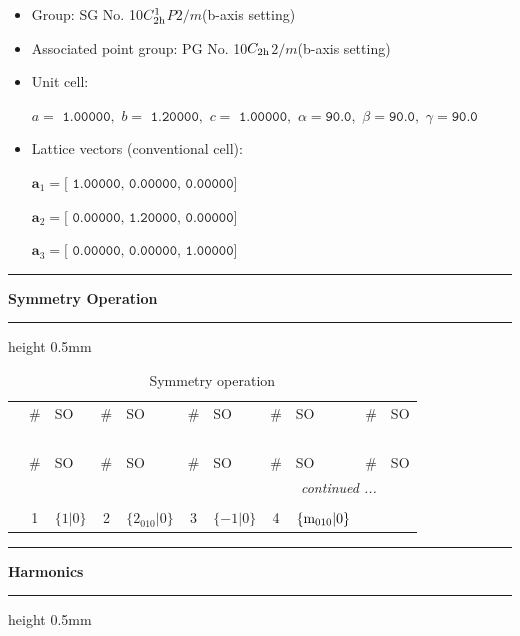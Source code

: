 \documentclass[fleqn,10pt,landscape]{jsarticle}
\begin{document}
\begin{itemize}
\item Group: SG No. 10\quad$C_{\rm 2h}^{1}$\quad$P2/m$\quad(b-axis setting)\quad[ monoclinic ]
\item Associated point group: PG No. 10\quad$C_{\rm 2h}$\quad$2/m$\quad(b-axis setting)\quad[ monoclinic ]
\end{itemize}
\begin{itemize}
\item Unit cell:

\quad $a=\texttt{ 1.00000},\,\, b=\texttt{ 1.20000},\,\, c=\texttt{ 1.00000},\,\, \alpha=\texttt{90.0},\,\, \beta=\texttt{90.0},\,\, \gamma=\texttt{90.0}$

\item Lattice vectors (conventional cell):

\quad $\bm{a}_1=\texttt{[ 1.00000, 0.00000, 0.00000]}$

\quad $\bm{a}_2=\texttt{[ 0.00000, 1.20000, 0.00000]}$

\quad $\bm{a}_3=\texttt{[ 0.00000, 0.00000, 1.00000]}$

\end{itemize}
\vspace{5mm}
\noindent \rule[0.5mm]{5mm}{0.5mm}\hspace{3mm}\textbf{Symmetry Operation}\hspace{3mm}\leaders\hrule height 0.5mm\hfill\kern0pt
\vspace{3mm}

\renewcommand{\arraystretch}{1.6}
\begin{longtable}[l]{c|cl|cl|cl|cl|cl}
\captionsetup{justification=raggedright, singlelinecheck=off}
\caption{Symmetry operation}
 \\
 \hline \hline
 & \# & SO & \# & SO & \# & SO & \# & SO & \# & SO \\ \hline \endfirsthead

\multicolumn{10}{l}{\tablename\ \thetable{}} \\
 \hline \hline
 & \# & SO & \# & SO & \# & SO & \# & SO & \# & SO \\ \hline \endhead

 \hline \hline
\multicolumn{10}{r}{\footnotesize\it continued ...} \\ \endfoot

 \hline \hline
\multicolumn{10}{r}{} \\ \endlastfoot

 & 1 & $\{1|0\}$ & 2 & $\{2{}_{010}|0\}$ & 3 & $\{-1|0\}$ & 4 & $\{{\rm m}_{010}|0\}$ \\
\end{longtable}
\vspace{5mm}
\noindent \rule[0.5mm]{5mm}{0.5mm}\hspace{3mm}\textbf{Harmonics}\hspace{3mm}\leaders\hrule height 0.5mm\hfill\kern0pt
\vspace{3mm}
\end{document}
